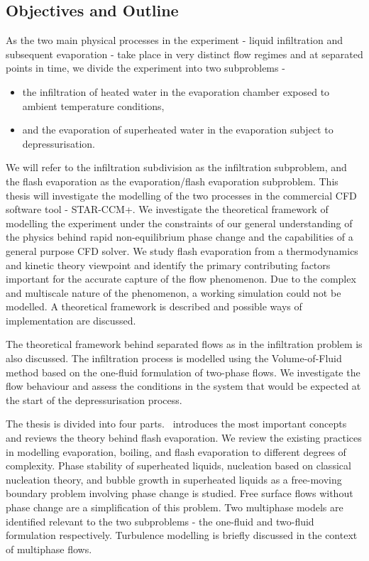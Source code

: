 \subsection{Objectives and Outline}
As the two main physical processes in the experiment - liquid infiltration and subsequent evaporation -
 take place in very distinct flow regimes and at separated points in time, we divide the experiment into 
 two subproblems - 
\begin{itemize}
    \item the infiltration of heated water in the evaporation chamber exposed to ambient temperature conditions, 
    \item and the evaporation of superheated water in the evaporation subject to depressurisation.
 \end{itemize}
 We will refer to the infiltration subdivision as the infiltration subproblem, and the flash evaporation
 as the evaporation/flash evaporation subproblem. This thesis will investigate the modelling 
 of the two processes in the commercial CFD software tool - STAR-CCM+. We investigate the theoretical framework
 of modelling the experiment under the constraints of our general understanding of the physics behind
 rapid non-equilibrium phase change and the capabilities of a general purpose CFD solver. We study 
 flash evaporation from a thermodynamics and kinetic theory viewpoint and identify the primary contributing
 factors important for the accurate capture of the flow phenomenon. Due to the complex and
 multiscale nature of the phenomenon, a working simulation could not be modelled. A theoretical framework
 is described and possible ways of implementation are discussed.

 The theoretical framework behind separated flows as in the infiltration problem is also discussed. 
 The infiltration process is modelled using the Volume-of-Fluid method based on the one-fluid 
 formulation of two-phase flows. We investigate the flow behaviour and assess the conditions in the 
 system that would be expected at the start of the depressurisation process. 

 The thesis is divided into four parts.~ introduces the most important concepts and 
 reviews the theory behind flash evaporation. We review the existing practices in modelling 
 evaporation, boiling, and flash evaporation to different degrees of complexity. Phase stability 
 of superheated liquids, nucleation based on classical nucleation theory, and bubble growth in superheated
 liquids as a free-moving boundary problem involving phase change is studied. Free surface flows without phase 
 change are a simplification of this problem. Two multiphase models are identified relevant to 
 the two subproblems - the one-fluid and two-fluid formulation respectively. Turbulence modelling is 
 briefly discussed in the context of multiphase flows.


